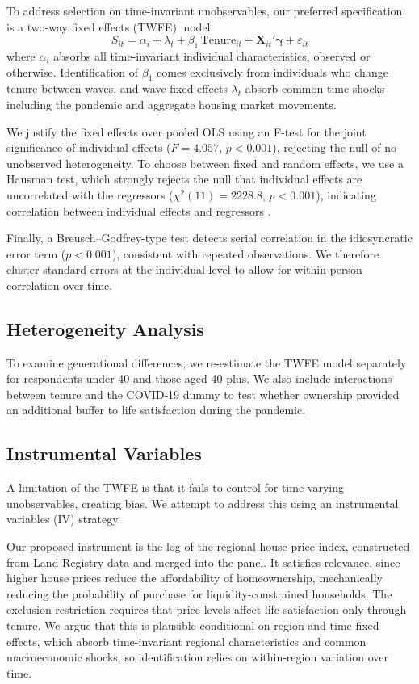 \documentclass[12pt,a4paper]{article}
\begin{document}
To address selection on time-invariant unobservables, our preferred
specification is a two-way fixed effects (TWFE) model:
\begin{equation}
    S_{it} = \alpha_{i} + \lambda_{t} + \beta_{1}\,\text{Tenure}_{it} +
    \mathbf{X}_{it}'\boldsymbol{\gamma} + \varepsilon_{it}
\end{equation}
where $\alpha_{i}$ absorbs all time-invariant individual characteristics,
observed or otherwise. Identification of $\beta_{1}$ comes exclusively from
individuals who change tenure between waves, and wave fixed effects
$\lambda_{t}$ absorb common time shocks including the pandemic and aggregate
housing market movements.
 
We justify the fixed effects over pooled OLS using an F-test for the joint significance of individual effects ($F = 4.057$, $p < 0.001$), rejecting the null of no unobserved heterogeneity.
To choose between fixed and random effects, we use a Hausman test, which strongly rejects the null that individual effects are uncorrelated with the regressors ($\chi^{2}(11) = 2228.8$, $p < 0.001$), indicating correlation between individual effects and regressors \citet{Hausman1978}. 

Finally, a Breusch--Godfrey-type test detects serial correlation in the idiosyncratic error term ($p < 0.001$), consistent with repeated observations. We therefore cluster standard errors at the individual level to allow for within-person correlation over time. 
 
\subsection{Heterogeneity Analysis}
 
To examine generational differences, we re-estimate the TWFE model
separately for respondents under 40 and those aged 40 plus. We also
include interactions between tenure and the COVID-19 dummy to test whether
ownership provided an additional buffer to life satisfaction during the
pandemic.
 
\subsection{Instrumental Variables}

A limitation of the TWFE is that it fails to control for time-varying unobservables, creating bias. We attempt to address this using an
instrumental variables (IV) strategy.
 
Our proposed instrument is the log of the regional house price index,
constructed from Land Registry data and merged into the panel.  It satisfies relevance, since higher house
prices reduce the affordability of homeownership, mechanically reducing the
probability of purchase for liquidity-constrained households. The exclusion
restriction requires that price levels affect life satisfaction only
through tenure. We argue that this is plausible conditional on region and time fixed effects, which absorb time-invariant regional characteristics and common macroeconomic shocks, so identification relies on within-region variation over time. 
 
\end{document}

